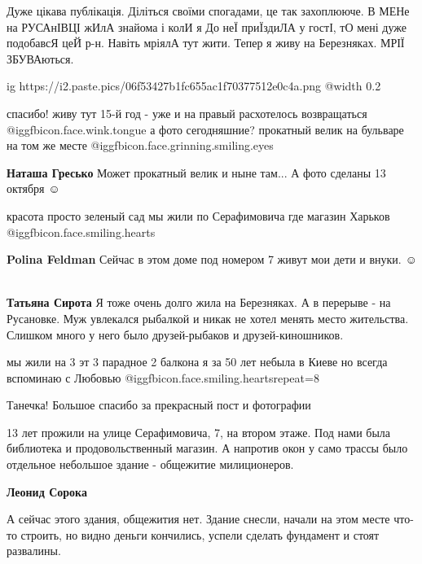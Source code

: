 \begin{itemize}

Дуже цікава публікація. Діліться своїми спогадами, це так захоплююче. В МЕНе на
РУСАнІВЦІ жИлА знайома і колИ я До неЇ приЇздиЛА у гостІ, тО мені дуже
подобавсЯ цеЙ р-н. Навіть мріялА тут жити. Тепер я живу на Березняках. МРІЇ
ЗБУВАються.


\ifcmt
  ig https://i2.paste.pics/06f53427b1fc655ac1f70377512e0c4a.png
  @width 0.2
\fi


спасибо! живу тут 15-й год - уже и на правый расхотелось возвращаться @igg{fbicon.face.wink.tongue}  а фото
сегодняшние? прокатный велик на бульваре на том же месте @igg{fbicon.face.grinning.smiling.eyes} 

\textbf{Наташа Гресько} Может прокатный велик и ныне там...
А фото сделаны 13 октября ☺ ️ 


красота просто зеленый сад мы жили по Серафимовича где магазин Харьков @igg{fbicon.face.smiling.hearts} 

\begin{itemize} %
\textbf{Polina Feldman} Сейчас в этом доме под номером 7 живут мои дети и внуки. ☺ ️ 

\textbf{Татьяна Сирота} Я тоже очень долго жила на Березняках. А в перерыве - на Русановке. Муж увлекался рыбалкой и никак не хотел менять место жительства. Слишком много у него было друзей-рыбаков и друзей-киношников.

мы жили на 3 эт 3 парадное 2 балкона я за 50 лет небыла в Киеве но всегда вспоминаю с Любовью @igg{fbicon.face.smiling.hearts}{repeat=8} 
\end{itemize} %

Танечка!
Большое спасибо за прекрасный пост и фотографии


13 лет прожили на улице Серафимовича, 7, на втором этаже. Под нами была
библиотека и продовольственный магазин. А напротив окон у само трассы было
отдельное небольшое здание - общежитие милиционеров.

\begin{itemize} %
\textbf{Леонид Сорока} 

А сейчас этого здания, общежития нет. Здание снесли, начали на этом месте
что-то строить, но видно деньги кончились, успели сделать фундамент и стоят
развалины.


\end{itemize}
\end{itemize}
